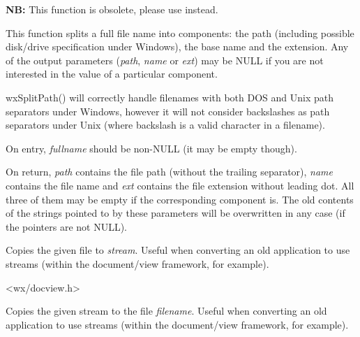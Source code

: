 \label{wxsplitfunction}


{\bf NB:} This function is obsolete, please use 
 instead.

This function splits a full file name into components: the path (including possible disk/drive
specification under Windows), the base name and the extension. Any of the output parameters
({\it path}, {\it name} or {\it ext}) may be NULL if you are not interested in the value of
a particular component.

wxSplitPath() will correctly handle filenames with both DOS and Unix path separators under
Windows, however it will not consider backslashes as path separators under Unix (where backslash
is a valid character in a filename).

On entry, {\it fullname} should be non-NULL (it may be empty though).

On return, {\it path} contains the file path (without the trailing separator), {\it name}
contains the file name and {\it ext} contains the file extension without leading dot. All
three of them may be empty if the corresponding component is. The old contents of the
strings pointed to by these parameters will be overwritten in any case (if the pointers
are not NULL).

\label{wxtransferfiletostream}


Copies the given file to {\it stream}. Useful when converting an old application to
use streams (within the document/view framework, for example).


<wx/docview.h>

\label{wxtransferstreamtofile}


Copies the given stream to the file {\it filename}. Useful when converting an old application to
use streams (within the document/view framework, for example).


